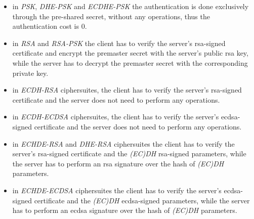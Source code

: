 \documentclass{llncs}
\begin{document}
\begin{itemize}
  \item  in \textit{PSK}, \textit{DHE-PSK} and \textit{ECDHE-PSK} the authentication is done exclusively through the pre-shared secret, without any
  operations, thus the authentication cost is $0$.
  \item in \textit{RSA} and \textit{RSA-PSK} the client has to verify the server's \gls{rsa}-signed certificate and encrypt the premaster secret with
  the server's public \gls{rsa} key, while the server has to decrypt the premaster secret with the corresponding private key.
  \item in \textit{ECDH-RSA} ciphersuites, the client has to verify the server's \gls{rsa}-signed certificate and the server does not
  need to perform any operations.
  \item in \textit{ECDH-ECDSA} ciphersuites, the client has to verify the server's \gls{ecdsa}-signed certificate and the server does not
  need to perform any operations.
  \item in \textit{ECHDE-RSA} and \textit{DHE-RSA} ciphersuites the client has to verify the server's \gls{rsa}-signed certificate and
  the \textit{(EC)DH} \gls{rsa}-signed parameters, while the server has to perform an \gls{rsa} signature over the hash of \textit{(EC)DH} parameters.
  \item in \textit{ECHDE-ECDSA} ciphersuites the client has to verify the server's \gls{ecdsa}-signed certificate and
  the \textit{(EC)DH} \gls{ecdsa}-signed parameters, while the server has to perform an \gls{ecdsa} signature over the hash of \textit{(EC)DH} parameters.
\end{itemize}
\end{document}
